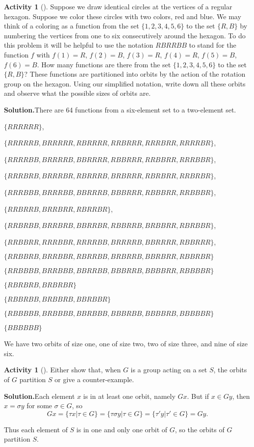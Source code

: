 \documentclass[10pt,]{book}
\theoremstyle{plain}
\theoremstyle{definition}
\newtheorem{activity}[project]{Activity}
\numberwithin{equation}{chapter}
\begin{document}
\begin{activity}[]\label{coloredhex}
Suppose we draw identical circles at the vertices of a regular hexagon. Suppose we color these circles with two colors, red and blue. We may think of a coloring as a function from the set \(\{1,2,3,4,5,6\}\) to the set \(\{R,B\}\) by numbering the vertices from one to six consecutively around the hexagon. To do this problem it will be helpful to use the notation \(RBRRBB\) to stand for the function \(f\) with \(f(1) =R\), \(f(2)=B\), \(f(3)=R\), \(f(4) = R\), \(f(5)=B\), \(f(6)=B\). How many functions are there from the set \(\{1,2,3,4,5,6\}\) to the set \(\{R,B\}\)? These functions are partitioned into orbits by the action of the rotation group on the hexagon. Using our simplified notation, write down all these orbits and observe what the possible sizes of orbits are.%
\par\medskip\noindent%
\textbf{Solution.}\quad There are 64 functions from a six-element set to a two-element set.%
\par
\(\{RRRRRR\}\),%
\par
\(\{RRRRRB, BRRRRR, RBRRRR, RRBRRR,
RRRBRR, RRRRBR\}\),%
\par
\(\{RRRRBB, BRRRRB, BBRRRR, RBBRRR, RRBBRR, RRRBBR\}\),%
\par
\(\{RRRBRB, BRRRBR, RBRRRB, BRBRRR, RBRBRR, RRBRBR\}\),%
\par
\(\{RRRBBB, BRRRBB, BBRRRB, BBBRRR, RBBBRR, RRBBBR\}\),%
\par
\(\{RRBRRB, BRRBRR, RBRRBR\}\),%
\par
\(\{RRBRBB, BRRBRB, BBRRBR, RBBRRB, BRBBRR, RBRBBR\}\),%
\par
\(\{RRBBRR, RRRBBR, RRRRBB, BRRRRB, BBRRRR, RBBRRR\}\),%
\par
\(\{RRBBRB, BRRBBR, RBRRBB, BRBRRB, BBRBRR, RBBRBR\}\)%
\par
\(\{RRBBBB, BRRBBB, BBRRBB, BBBRRB, BBBBRR, RBBBBR\}\)%
\par
\(\{RBRBRB,
BRBRBR\}\)%
\par
\(\{RBBRBB, BRBBRB, BBRBBR \}\)%
\par
\(\{RBBBBB, BRBBBB, BBRBBB, BBBRBB,BBBBRB, BBBBBR\}\)%
\par
\(\{BBBBBB\}\)%
\par
We have two orbits of size one, one of size two, two of size three, and nine of size six.%
\end{activity}
\begin{activity}[]\label{activity-292}
Either show that, when \(G\) is a group acting on a set \(S\), the orbits of \(G\) partition \(S\) or give a counter-example.%
\par\medskip\noindent%
\textbf{Solution.}\quad Each element \(x\) is in at least one orbit, namely \(Gx\). But if \(x\in Gy\), then \(x=\sigma y\) for some \(\sigma \in G\), so%
\begin{equation*}
Gx=\{\tau x|\tau
\in G\} =
\{\tau\sigma y|\tau\in G\}= \{\tau' y|\tau' \in G\} = Gy.
\end{equation*}
%
\par
Thus each element of \(S\) is in one and only one orbit of \(G\), so the orbits of \(G\) partition \(S\).%
\end{activity}
\end{document}

